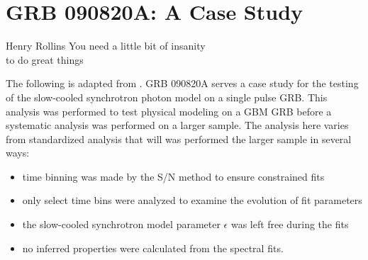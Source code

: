 \chapter{GRB 090820A: A Case Study}
\label{ch:grb090820A}
\begin{chapterquote}{Henry Rollins}
You need a little bit of insanity\\
to do great things
\end{chapterquote}

The following is adapted from \cite{Burgess:2012}. GRB 090820A serves
a case study for the testing of the slow-cooled synchrotron photon
model on a single pulse GRB. This analysis was performed to test
physical modeling on a GBM GRB before a systematic analysis was
performed on a larger sample. The analysis here varies from
standardized analysis that will was performed the larger sample in
several ways:
\begin{itemize}
\item time binning was made by the S/N method to ensure constrained fits
\item only select time bins were analyzed to examine the evolution of
  fit parameters
\item the slow-cooled synchrotron model parameter $\epsilon$ was left free during the fits
\item no inferred properties were calculated from the spectral fits.
\end{itemize}










              
              
